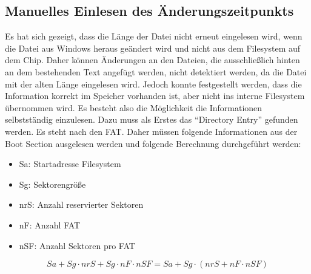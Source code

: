 \subsection{Manuelles Einlesen des Änderungszeitpunkts}
Es hat sich gezeigt, dass die Länge der Datei nicht erneut eingelesen wird, wenn die Datei aus Windows heraus geändert wird und nicht aus dem Filesystem auf dem Chip. Daher können Änderungen an den Dateien, die ausschließlich hinten an dem bestehenden Text angefügt werden, nicht detektiert werden, da die Datei mit der alten Länge eingelesen wird. Jedoch konnte festgestellt werden, dass die Information korrekt im Speicher vorhanden ist, aber nicht ins interne Filesystem übernommen wird. Es besteht also die Möglichkeit die Informationen selbstständig einzulesen. Dazu muss als Erstes das ``Directory Entry'' gefunden werden. Es steht nach den \ac{FAT}. Daher müssen folgende Informationen aus der Boot Section ausgelesen werden und folgende Berechnung durchgeführt werden:
\begin{itemize}
    \item Sa: Startadresse Filesystem
    \item Sg: Sektorengröße
    \item nrS: Anzahl reservierter Sektoren
    \item nF: Anzahl \ac{FAT}
    \item nSF: Anzahl Sektoren pro \ac{FAT}
\end{itemize}

\[Sa + Sg \cdot nrS + Sg \cdot nF \cdot nSF = Sa + Sg\cdot(nrS + nF \cdot nSF)\]

